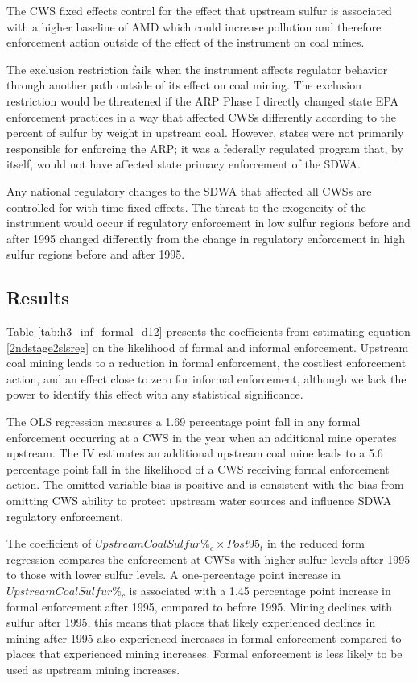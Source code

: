 \documentclass{article}
\begin{document}
The CWS fixed effects control for the effect that upstream sulfur is associated with a higher baseline of AMD which could increase pollution and therefore enforcement action outside of the effect of the instrument on coal mines.

The exclusion restriction fails when the instrument affects regulator behavior through another path outside of its effect on coal mining. The exclusion restriction would be threatened if the ARP Phase I directly changed state EPA enforcement practices in a way that affected CWSs differently according to the percent of sulfur by weight in upstream coal. However, states were not primarily responsible for enforcing the ARP; it was a federally regulated program that, by itself, would not have affected state primacy enforcement of the SDWA.

Any national regulatory changes to the SDWA that affected all CWSs are controlled for with time fixed effects. The threat to the exogeneity of the instrument would occur if regulatory enforcement in low sulfur regions before and after 1995 changed differently from the change in regulatory enforcement in high sulfur regions before and after 1995.

\subsection{Results}

Table \ref{tab:h3_inf_formal_d12} presents the coefficients from estimating equation \ref{2ndstage2slsreg} on the likelihood of formal and informal enforcement. Upstream coal mining leads to a reduction in formal enforcement, the costliest enforcement action, and an effect close to zero for informal enforcement, although we lack the power to identify this effect with any statistical significance. 

The OLS regression measures a 1.69 percentage point fall in any formal enforcement occurring at a CWS in the year when an additional mine operates upstream. The IV estimates an additional upstream coal mine leads to a 5.6 percentage point fall in the likelihood of a CWS receiving formal enforcement action. The omitted variable bias is positive and is consistent with the bias from omitting CWS ability to protect upstream water sources and influence SDWA regulatory enforcement. 

The coefficient of $UpstreamCoalSulfur\%_c \times Post95_t$ in the reduced form regression compares the enforcement at CWSs with higher sulfur levels after 1995 to those with lower sulfur levels. A one-percentage point increase in $UpstreamCoalSulfur\%_c$ is associated with a 1.45 percentage point increase in formal enforcement after 1995, compared to before 1995. Mining declines with sulfur after 1995, this means that places that likely experienced declines in mining after 1995 also experienced increases in formal enforcement compared to places that experienced mining increases. Formal enforcement is less likely to be used as upstream mining increases. 
\end{document}
